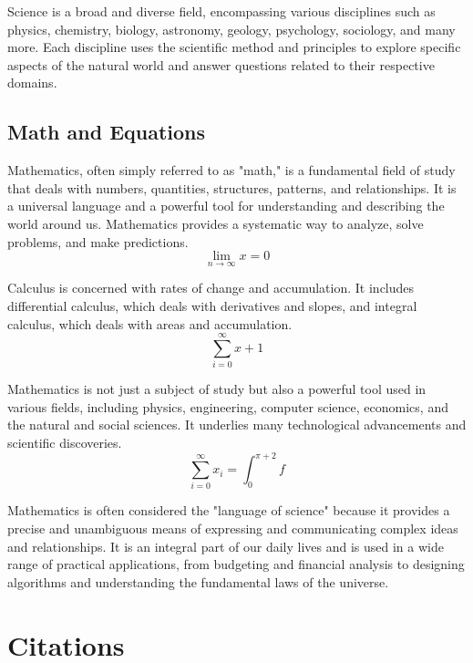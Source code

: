 \documentclass[sigconf, nonacm]{acmart}
\begin{document}
Science is a broad and diverse field, encompassing various disciplines such as physics, chemistry, biology, astronomy, geology, psychology, sociology, and many more. Each discipline uses the scientific method and principles to explore specific aspects of the natural world and answer questions related to their respective domains.

\subsection{Math and Equations}

Mathematics, often simply referred to as "math," is a fundamental field of study that deals with numbers, quantities, structures, patterns, and relationships. It is a universal language and a powerful tool for understanding and describing the world around us. Mathematics provides a systematic way to analyze, solve problems, and make predictions.
\begin{equation}
  \lim_{n\rightarrow \infty}x=0
\end{equation}

Calculus is concerned with rates of change and accumulation. It includes differential calculus, which deals with derivatives and slopes, and integral calculus, which deals with areas and accumulation. 
\begin{displaymath}
  \sum_{i=0}^{\infty} x + 1
\end{displaymath}

Mathematics is not just a subject of study but also a powerful tool used in various fields, including physics, engineering, computer science, economics, and the natural and social sciences. It underlies many technological advancements and scientific discoveries. 
\begin{equation}
  \sum_{i=0}^{\infty}x_i=\int_{0}^{\pi+2} f
\end{equation}

Mathematics is often considered the "language of science" because it provides a precise and unambiguous means of expressing and communicating complex ideas and relationships. It is an integral part of our daily lives and is used in a wide range of practical applications, from budgeting and financial analysis to designing algorithms and understanding the fundamental laws of the universe.

\section{Citations}
\end{document}
